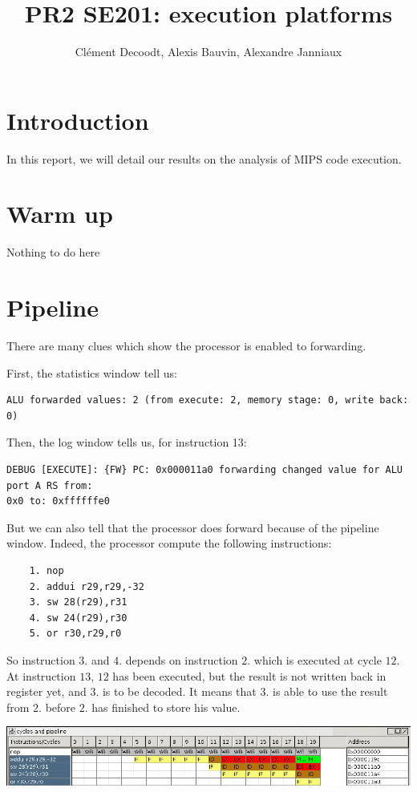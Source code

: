 \documentclass[a4paper]{report}
\author{Clément Decoodt, Alexis Bauvin, Alexandre Janniaux}
\title{PR2 SE201: execution platforms}
\begin{document}
\maketitle

\section{Introduction}

In this report, we will detail our results on the analysis of MIPS code execution.

\section{Warm up}

Nothing to do here

\section{Pipeline}

There are many clues which show the processor is enabled to forwarding.

First, the statistics window tell us:
\begin{verbatim}
ALU forwarded values: 2 (from execute: 2, memory stage: 0, write back: 0)
\end{verbatim}

Then, the log window tells us, for instruction 13:
\begin{verbatim}
DEBUG [EXECUTE]: {FW} PC: 0x000011a0 forwarding changed value for ALU port A RS from:
0x0 to: 0xffffffe0
\end{verbatim}

But we can also tell that the processor does forward because of the pipeline window.
Indeed, the processor compute the following instructions:

\begin{verbatim}
    1. nop
    2. addui r29,r29,-32
    3. sw 28(r29),r31
    4. sw 24(r29),r30
    5. or r30,r29,r0
\end{verbatim}

So instruction $3.$ and $4.$  depends on instruction $2.$ which is executed at cycle $12$.
At instruction $13$, $12$ has been executed, but the result is not written back in register yet,
and $3.$ is to be decoded. It means that $3.$ is able to use the result from $2.$ before $2.$ has finished
to store his value.

\begin{center}
	\includegraphics[width=\textwidth-2cm]{images/pipeline_forwarding.png}
\end{center}
\end{document}

